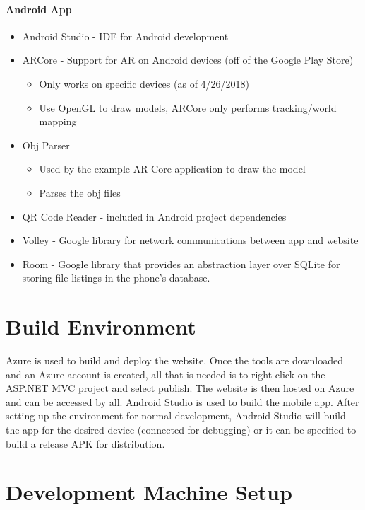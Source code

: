 \paragraph{Android App}
\begin{itemize}
    \item Android Studio - IDE for Android development
    \item ARCore - Support for AR on Android devices (off of the Google Play Store)
    \begin{itemize}
        \item Only works on specific devices (as of 4/26/2018)
        \item Use OpenGL to draw models, ARCore only performs tracking/world mapping
    \end{itemize}
    \item Obj Parser
    \begin{itemize}
        \item Used by the example AR Core application to draw the model
        \item Parses the obj files
    \end{itemize}
    \item QR Code Reader - included in Android project dependencies
    \item Volley - Google library for network communications between app and website
    \item Room - Google library that provides an abstraction layer over SQLite for storing file listings in the phone's database.
\end{itemize}

\section{Build  Environment}
Azure is used to build and deploy the website. Once the tools are downloaded and an Azure account is created, 
all that is needed is to right-click on the ASP.NET MVC project and select publish. The website is then hosted on Azure and
can be accessed by all.
Android Studio is used to build the mobile app. After setting up the environment for normal development, Android Studio will build the app for the desired device (connected for debugging) or it can be specified to build a release APK for distribution. 

\section{Development Machine Setup}

